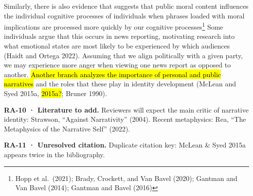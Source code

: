 \documentclass[
  letterpaper,
  DIV=11,
  numbers=noendperiod]{scrartcl}
\theoremstyle{remark}
\begin{document}
Similarly, there is also evidence that suggests that public moral
content influences the individual cognitive processes of individuals
when phrases loaded with moral implications are processed more quickly
by our cognitive processes\footnote{Hopp et al.~(2021); Brady, Crockett,
  and Van Bavel (2020); Gantman and Van Bavel (2014); Gantman and Bavel
  (2016)} Some individuals argue that this occurs in news reporting,
motivating research into what emotional states are most likely to be
experienced by which audiences (Haidt and Ortega 2022). Assuming that we
align politically with a given party, we may experience more anger when
viewing one news report as opposed to another. \hl{Another branch
analyzes the importance of personal and public narratives} and the roles
that these play in identity development (McLean and Syed 2015a,
\hl{2015a?}; Bruner 1990).

\begin{tcolorbox}[enhanced jigsaw, arc=.35mm, bottomrule=.15mm, bottomtitle=1mm, breakable, colback=white, colbacktitle=quarto-callout-tip-color!10!white, colframe=quarto-callout-tip-color-frame, coltitle=black, left=2mm, leftrule=.75mm, opacityback=0, opacitybacktitle=0.6, rightrule=.15mm, title=\textcolor{quarto-callout-tip-color}{\faLightbulb}\hspace{0.5em}{Tip}, titlerule=0mm, toprule=.15mm, toptitle=1mm]

\textbf{RA-10 · Literature to add.} Reviewers will expect the main
critic of narrative identity: Strawson, ``Against Narrativity'' (2004).
Recent metaphysics: Rea, ``The Metaphysics of the Narrative Self''
(2022).

\end{tcolorbox}

\begin{tcolorbox}[enhanced jigsaw, arc=.35mm, bottomrule=.15mm, bottomtitle=1mm, breakable, colback=white, colbacktitle=quarto-callout-warning-color!10!white, colframe=quarto-callout-warning-color-frame, coltitle=black, left=2mm, leftrule=.75mm, opacityback=0, opacitybacktitle=0.6, rightrule=.15mm, title=\textcolor{quarto-callout-warning-color}{\faExclamationTriangle}\hspace{0.5em}{Warning}, titlerule=0mm, toprule=.15mm, toptitle=1mm]

\textbf{RA-11 · Unresolved citation.} Duplicate citation key: McLean \&
Syed 2015a appears twice in the bibliography.

\end{tcolorbox}
\end{document}

